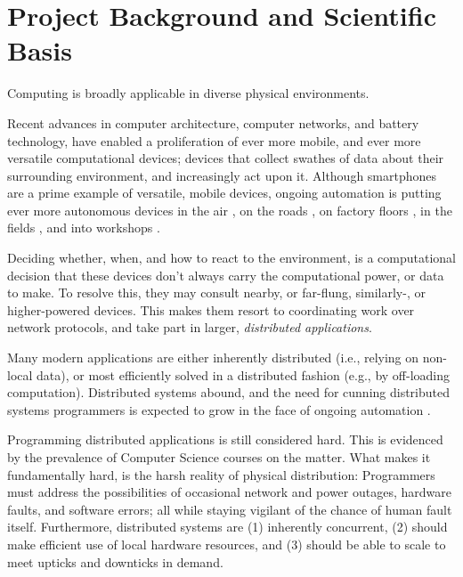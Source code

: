 \section{Project Background and Scientific Basis}
\label{sec:project-background-and-scientific-basis}

Computing is broadly applicable in diverse physical environments.

Recent advances in computer architecture, computer networks, and
battery technology, have enabled a proliferation of ever more mobile,
and ever more versatile computational devices; devices that collect
swathes of data about their surrounding environment, and increasingly
act upon it. Although smartphones are a prime example of versatile,
mobile devices, ongoing automation is putting ever more autonomous
devices in the air \cite{economist2017drones}, on the roads
\cite{economist2018cars}, on factory floors
\cite{spiegel2016industrie, spiegel2017industrie}, in the fields
\cite{ng2017smartfarming}, and into workshops
\cite{economist2017jets}.

Deciding whether, when, and how to react to the environment, is a
computational decision that these devices don't always carry the
computational power, or data to make. To resolve this, they may
consult nearby, or far-flung, similarly-, or higher-powered devices.
This makes them resort to coordinating work over network protocols,
and take part in larger, \emph{distributed applications}.

\medskip

Many modern applications are either inherently distributed (i.e.,
relying on non-local data), or most efficiently solved in a
distributed fashion (e.g., by off-loading computation). Distributed
systems abound, and the need for cunning distributed systems
programmers is expected to grow in the face of ongoing automation
\cite{weforum2018futureofjobs}.

Programming distributed applications is still considered hard. This is
evidenced by the prevalence of Computer Science courses
\cite{apnes2017notes, morris2017notes} on the matter. What makes it
fundamentally hard, is the harsh reality of physical distribution:
Programmers must address the possibilities of occasional network and
power outages, hardware faults, and software errors; all while staying
vigilant of the chance of human fault itself.  Furthermore,
distributed systems are (1) inherently concurrent, (2) should make
efficient use of local hardware resources, and (3) should be able to
scale to meet upticks and downticks in demand.


